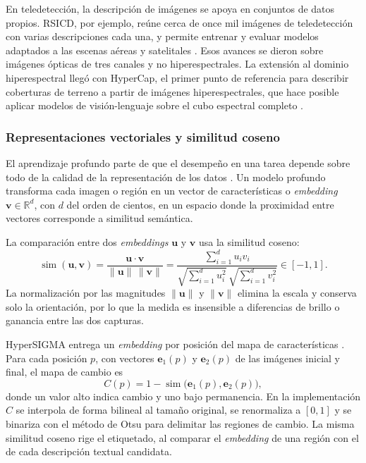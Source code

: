 \documentclass[12pt,onecolumn]{IEEEtran}
\begin{document}
En teledetección, la descripción de imágenes se apoya en conjuntos de datos propios. RSICD, por ejemplo, reúne cerca de once mil imágenes de teledetección con varias descripciones cada una, y permite entrenar y evaluar modelos adaptados a las escenas aéreas y satelitales \cite{lu2017rsicd}. Esos avances se dieron sobre imágenes ópticas de tres canales y no hiperespectrales. La extensión al dominio hiperespectral llegó con HyperCap, el primer punto de referencia para describir coberturas de terreno a partir de imágenes hiperespectrales, que hace posible aplicar modelos de visión-lenguaje sobre el cubo espectral completo \cite{das2025hypercap}.



\subsubsection{Representaciones vectoriales y similitud coseno}
El aprendizaje profundo parte de que el desempeño en una tarea depende sobre todo de la calidad de la representación de los datos \cite{bengio2013representation}. Un modelo profundo transforma cada imagen o región en un vector de características o \textit{embedding} $\mathbf{v}\in\mathbb{R}^{d}$, con $d$ del orden de cientos, en un espacio donde la proximidad entre vectores corresponde a similitud semántica.

La comparación entre dos \textit{embeddings} $\mathbf{u}$ y $\mathbf{v}$ usa la similitud coseno:
\begin{equation}
\operatorname{sim}(\mathbf{u},\mathbf{v})=\frac{\mathbf{u}\cdot\mathbf{v}}{\lVert\mathbf{u}\rVert\,\lVert\mathbf{v}\rVert}=\frac{\sum_{i=1}^{d}u_i v_i}{\sqrt{\sum_{i=1}^{d}u_i^{2}}\,\sqrt{\sum_{i=1}^{d}v_i^{2}}}\in[-1,1].
\end{equation}
La normalización por las magnitudes $\lVert\mathbf{u}\rVert$ y $\lVert\mathbf{v}\rVert$ elimina la escala y conserva solo la orientación, por lo que la medida es insensible a diferencias de brillo o ganancia entre las dos capturas.

HyperSIGMA entrega un \textit{embedding} por posición del mapa de características \cite{wang2024hypersigma}. Para cada posición $p$, con vectores $\mathbf{e}_1(p)$ y $\mathbf{e}_2(p)$ de las imágenes inicial y final, el mapa de cambio es
\begin{equation}
C(p)=1-\operatorname{sim}\!\big(\mathbf{e}_1(p),\mathbf{e}_2(p)\big),
\end{equation}
donde un valor alto indica cambio y uno bajo permanencia. En la implementación $C$ se interpola de forma bilineal al tamaño original, se renormaliza a $[0,1]$ y se binariza con el método de Otsu para delimitar las regiones de cambio. La misma similitud coseno rige el etiquetado, al comparar el \textit{embedding} de una región con el de cada descripción textual candidata.
\end{document}
